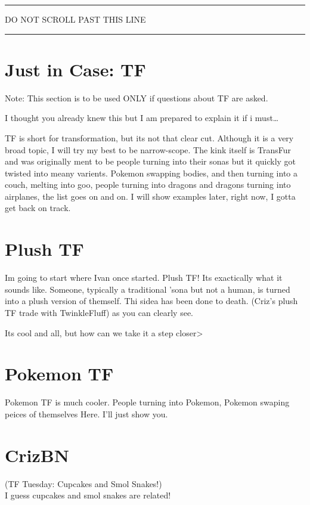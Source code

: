 \documentclass{article}
\begin{document}
\noindent \rule{\textwidth}{4pt}

\noindent \begin{center}DO NOT SCROLL PAST THIS LINE\end{center}

\noindent \rule{\textwidth}{4pt}
\newpage

\section{Just in Case: TF}
Note: This section is to be used ONLY if questions about TF are asked.

I thought you already knew this but I am prepared to explain it if i must\ldots{}

TF is short for transformation, but its not that clear cut. Although it is a very broad topic,
I will try my best to be narrow-scope. The kink itself is TransFur and was originally ment to
be people turning into their sonas but it quickly got twisted into meany varients. Pokemon
swapping bodies, and then turning into a couch, melting into goo, people turning into dragons
and dragons turning into airplanes, the list goes on and on. I will show examples later,
right now, I gotta get back on track.

\section{Plush TF}
Im going to start where Ivan once started. Plush TF! Its exactically what it sounds like.
Someone, typically a traditional 'sona but not a human, is turned into a plush version of themself.
Thi sidea has been done to death. (Criz's plush TF trade with TwinkleFluff) as you can clearly see.

Its cool and all, but how can we take it a step closer>

\section{Pokemon TF}
Pokemon TF is much cooler. People turning into Pokemon, Pokemon swaping peices of themselves
Here. I'll just show you.

\section{CrizBN}
(TF Tuesday: Cupcakes and Smol Snakes!)\\
I guess cupcakes and smol snakes are related! 
\end{document}

